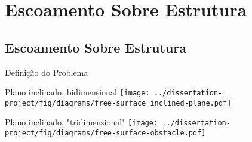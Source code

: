 \section{Escoamento Sobre Estrutura}


\subsection{Escoamento Sobre Estrutura}

\begin{frame}{Definição do Problema}
    \begin{minipage}[c]{0.49\textwidth}
        \begin{exampleblock}{Plano inclinado, bidimensional}
            \texttt{[image: ../dissertation-project/fig/diagrams/free-surface\_inclined-plane.pdf]}
        \end{exampleblock}
    \end{minipage}
    \hfill
    \begin{minipage}[c]{0.49\textwidth}
        \begin{exampleblock}{Plano inclinado, "tridimensional"}
            \texttt{[image: ../dissertation-project/fig/diagrams/free-surface-obstacle.pdf]}
        \end{exampleblock}
    \end{minipage}
\end{frame}


